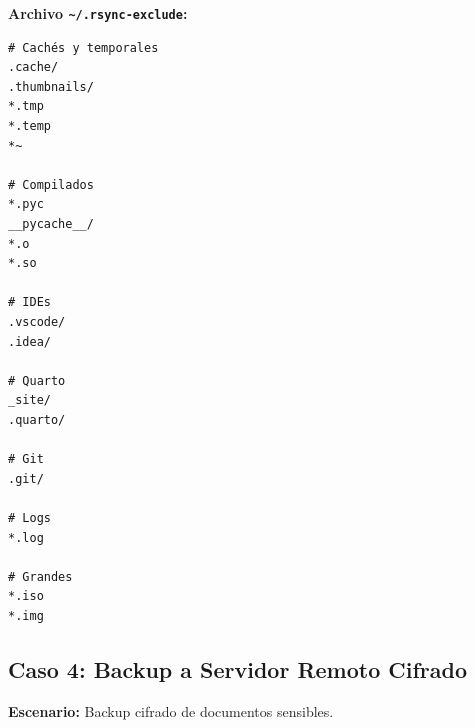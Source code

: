 \documentclass[
  doc,
  floatsintext,
  longtable,
  a4paper,
  nolmodern,
  notxfonts,
  notimes,
  12pt,
  colorlinks=true,linkcolor=blue,citecolor=blue,urlcolor=blue]{apa7}
\newenvironment{Shaded}{\begin{snugshade}}{\end{snugshade}}
\newcommand{\AttributeTok}[1]{\textcolor[rgb]{0.40,0.45,0.13}{#1}}
\newcommand{\BuiltInTok}[1]{\textcolor[rgb]{0.00,0.23,0.31}{#1}}
\newcommand{\CommentTok}[1]{\textcolor[rgb]{0.37,0.37,0.37}{#1}}
\newcommand{\FunctionTok}[1]{\textcolor[rgb]{0.28,0.35,0.67}{#1}}
\newcommand{\KeywordTok}[1]{\textcolor[rgb]{0.00,0.23,0.31}{\textbf{#1}}}
\newcommand{\NormalTok}[1]{\textcolor[rgb]{0.00,0.23,0.31}{#1}}
\newcommand{\StringTok}[1]{\textcolor[rgb]{0.13,0.47,0.30}{#1}}
\newcommand{\VariableTok}[1]{\textcolor[rgb]{0.07,0.07,0.07}{#1}}
\begin{document}
\begin{Shaded}
\end{Shaded}

\textbf{Archivo \texttt{\textasciitilde{}/.rsync-exclude}:}

\begin{verbatim}
# Cachés y temporales
.cache/
.thumbnails/
*.tmp
*.temp
*~

# Compilados
*.pyc
__pycache__/
*.o
*.so

# IDEs
.vscode/
.idea/

# Quarto
_site/
.quarto/

# Git
.git/

# Logs
*.log

# Grandes
*.iso
*.img
\end{verbatim}

\subsection{Caso 4: Backup a Servidor Remoto
Cifrado}\label{caso-4-backup-a-servidor-remoto-cifrado}

\textbf{Escenario:} Backup cifrado de documentos sensibles.
\end{document}
